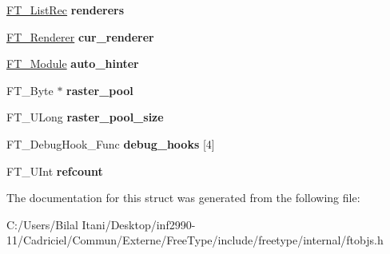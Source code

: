\begin{DoxyCompactItemize}
\item 
\hyperlink{struct_f_t___list_rec__}{F\+T\+\_\+\+List\+Rec} {\bfseries renderers}\hypertarget{struct_f_t___library_rec___ad9503f71cf4e4d88edfbdda59eb5e43d}{}\label{struct_f_t___library_rec___ad9503f71cf4e4d88edfbdda59eb5e43d}

\item 
\hyperlink{struct_f_t___renderer_rec__}{F\+T\+\_\+\+Renderer} {\bfseries cur\+\_\+renderer}\hypertarget{struct_f_t___library_rec___a528dd3298756070ecad7d0f82f009294}{}\label{struct_f_t___library_rec___a528dd3298756070ecad7d0f82f009294}

\item 
\hyperlink{struct_f_t___module_rec__}{F\+T\+\_\+\+Module} {\bfseries auto\+\_\+hinter}\hypertarget{struct_f_t___library_rec___ae608b33b223905d4d70b782ed7ec8c78}{}\label{struct_f_t___library_rec___ae608b33b223905d4d70b782ed7ec8c78}

\item 
F\+T\+\_\+\+Byte $\ast$ {\bfseries raster\+\_\+pool}\hypertarget{struct_f_t___library_rec___aa8dd799d2efb7817b05c4a02a6828275}{}\label{struct_f_t___library_rec___aa8dd799d2efb7817b05c4a02a6828275}

\item 
F\+T\+\_\+\+U\+Long {\bfseries raster\+\_\+pool\+\_\+size}\hypertarget{struct_f_t___library_rec___a798afdcaf0cda349eb454b769abfa251}{}\label{struct_f_t___library_rec___a798afdcaf0cda349eb454b769abfa251}

\item 
F\+T\+\_\+\+Debug\+Hook\+\_\+\+Func {\bfseries debug\+\_\+hooks} \mbox{[}4\mbox{]}\hypertarget{struct_f_t___library_rec___a1ba1f5abd0254a22dae533a9ac971b84}{}\label{struct_f_t___library_rec___a1ba1f5abd0254a22dae533a9ac971b84}

\item 
F\+T\+\_\+\+U\+Int {\bfseries refcount}\hypertarget{struct_f_t___library_rec___aad71b1ecfaea56594fbd21c18e72f15c}{}\label{struct_f_t___library_rec___aad71b1ecfaea56594fbd21c18e72f15c}

\end{DoxyCompactItemize}


The documentation for this struct was generated from the following file\+:\begin{DoxyCompactItemize}
\item 
C\+:/\+Users/\+Bilal Itani/\+Desktop/inf2990-\/11/\+Cadriciel/\+Commun/\+Externe/\+Free\+Type/include/freetype/internal/ftobjs.\+h\end{DoxyCompactItemize}
